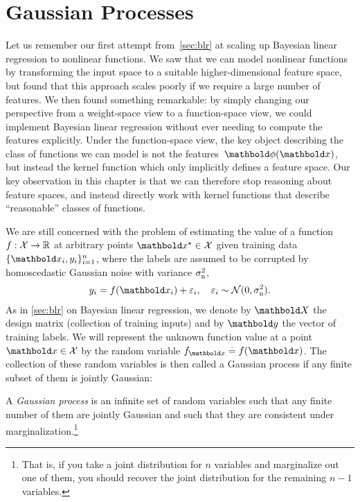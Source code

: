 \chapter{Gaussian Processes}\label{sec:gp}

Let us remember our first attempt from~\cref{sec:blr} at scaling up Bayesian linear regression to nonlinear functions.
We saw that we can model nonlinear functions by transforming the input space to a suitable higher-dimensional feature space, but found that this approach scales poorly if we require a large number of features.
We then found something remarkable: by simply changing our perspective from a weight-space view to a function-space view, we could implement Bayesian linear regression without ever needing to compute the features explicitly.
Under the function-space view, the key object describing the class of functions we can model is not the features~$\vphi(\vx)$, but instead the kernel function which only implicitly defines a feature space.
Our key observation in this chapter is that we can therefore stop reasoning about feature spaces, and instead directly work with kernel functions that describe ``reasonable'' classes of functions.

We are still concerned with the problem of estimating the value of a function $f : \mathcal{X} \to \mathbb{R}$ at arbitrary points $\vxs \in \spX$ given training data $\{\vx_i,y_i\}_{i=1}^n$, where the labels are assumed to be corrupted by homoscedastic Gaussian noise with variance $\sigma_{\mathrm{n}}^2$, \begin{align*}
  y_i = f(\vx_i) + \varepsilon_i,\quad \varepsilon_i \sim \N{0}{\sigman^2}.
\end{align*}
As in \cref{sec:blr} on Bayesian linear regression, we denote by $\mX$ the design matrix (collection of training inputs) and by $\vy$ the vector of training labels.
We will represent the unknown function value at a point $\vx \in \spX$ by the random variable $f_{\vx} \defeq f(\vx)$.
The collection of these random variables is then called a Gaussian process if any finite subset of them is jointly Gaussian:

\begin{defn}
  A \emph{Gaussian process} is an infinite set of random variables such that any finite number of them are jointly Gaussian and such that they are consistent under marginalization.\footnote{That is, if you take a joint distribution for $n$ variables and marginalize out one of them, you should recover the joint distribution for the remaining $n-1$ variables.}
\end{defn}

